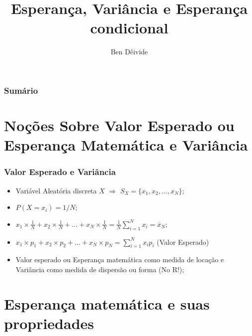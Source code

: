 \documentclass{beamer}
\title[Esperança, Variância e Esperança condicional]{Esperança, Variância e Esperança condicional} %
\author{Ben D\^eivide} %
\institute[UFLA] %
\theoremstyle{plain}
\begin{document}
\begin{frame}
\titlepage %
\end{frame}

\begin{frame}
\frametitle{Sumário} %
\tableofcontents %
\end{frame}



\section{Noções Sobre Valor Esperado ou Esperança Matemática e Variância}

  \begin{frame}
    \frametitle{Valor Esperado e Variância}
    \begin{itemize}
    	\item Variável Aleatória discreta $X$ $\Rightarrow$ $S_X = \{x_1, x_2, \ldots, x_N\}$;\pause
    	\item $P(X = x_i) = 1/N$;\pause
    	\item $x_1 \times \frac{1}{N} + x_2 \times \frac{1}{N} + \ldots + x_N \times \frac{1}{N} = \frac{1}{N}\sum_{i = 1}^{N}x_i = \bar{x}_N$;\pause
    	\item $x_1 \times p_1 + x_2 \times p_2 + \ldots + x_N \times p_N = \sum_{i = 1}^{N}x_ip_i$ (Valor Esperado)\pause
    	\item Valor esperado ou Esperança matemática como medida de locação e Variância como medida de dispersão ou forma (No R!);
    \end{itemize}
  \end{frame}
  
  \section{Esperança matemática e suas propriedades}
  
\end{document}
